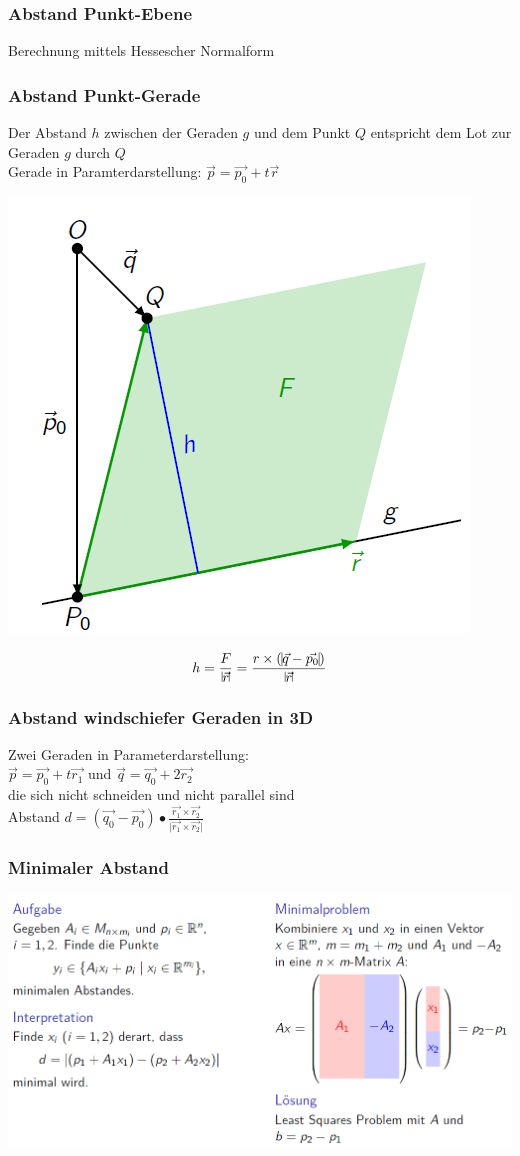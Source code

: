 		\subsubsection{Abstand Punkt-Ebene}
		Berechnung mittels Hessescher Normalform 
		
		
		\subsubsection{Abstand Punkt-Gerade}
		Der Abstand $h$ zwischen der Geraden $g$ und dem Punkt $Q$ entspricht dem Lot zur Geraden $g$ durch $Q$ \\
		Gerade in Paramterdarstellung: $\vec{p} = \vec{p_0} + t \vec{r}$ \\
		 
		 \begin{minipage}{0.45\linewidth}
		 \includegraphics[width=0.6\linewidth]{Bilder/punkt-gerade}
		 \end{minipage}
		\hfill
		\begin{minipage}{0.45\linewidth}
		 $$h = \frac{F}{\vline \vec{r} \vline} =  \frac{r \times ( \vline \vec{q} - \vec{p_0} \vline )}{\vline \vec{r} \vline} $$
		 \end{minipage}

			\subsubsection{Abstand windschiefer Geraden in 3D} 
			Zwei Geraden in Parameterdarstellung:\\					$\vec{p} = \vec{p_0} + t \vec{r_1}$ und $\vec{q} = \vec{q_0} + 2 \vec{r_2}$ \\
			die sich nicht schneiden und nicht parallel sind \\
			
		Abstand $d = (\vec{q_0} -\vec{p_0}) \bullet \frac{\vec{r_1} \times \vec{r_2}}{\vert \vec{r_1} \times \vec{r_2} \vert} $
		
		
		\subsubsection{Minimaler Abstand}
			\includegraphics[width=0.9\linewidth]{Bilder/minimaler-abstand}	
		
		
		\vfill\null
		\columnbreak	
		